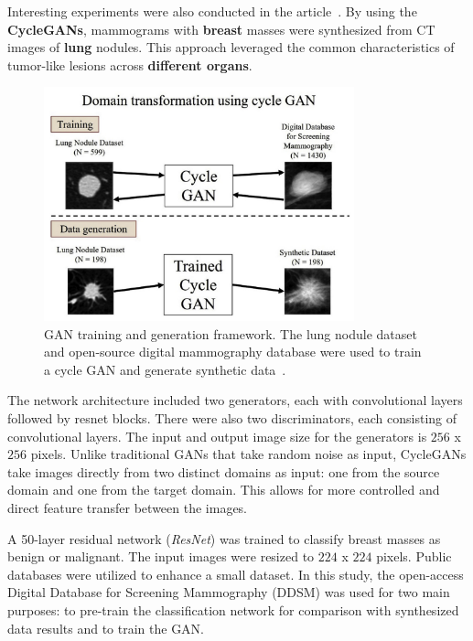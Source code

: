 Interesting experiments were also conducted in the article~\cite{CycleGANBreastCancer}. By using the \textbf{CycleGANs},  mammograms with \textbf{breast} masses were synthesized from CT images of \textbf{lung} nodules. This approach leveraged the common characteristics of tumor-like lesions across \textbf{different organs}.  

\begin{figure}[!h]
    \centering
    \includegraphics[width=0.8\textwidth]{Images/cycleImageGen.png}
    \caption{GAN training and generation framework. The lung nodule dataset and open-source digital mammography database were used to train a cycle GAN and generate synthetic data~\cite{CycleGANBreastCancer}.}
    \label{fig:overaugLC}
\end{figure}


The network architecture included two generators, each with convolutional layers followed by resnet blocks. There were also two discriminators, each consisting of convolutional layers. The input and output image size for the generators is $256$ x $256$ pixels. Unlike traditional GANs that take random noise as input, CycleGANs take images directly from two distinct domains as input: one from the source domain and one from the target domain. This allows for more controlled and direct feature transfer between the images.

A 50-layer residual network (\textit{ResNet}) was trained to classify breast masses as benign or malignant. The input images were resized to $224$ x $224$ pixels. Public databases were utilized to enhance a small dataset. In this study, the open-access Digital Database for Screening Mammography (DDSM) was used for two main purposes: to pre-train the classification network for comparison with synthesized data results and to train the GAN.

